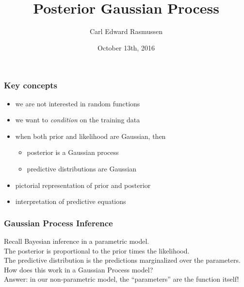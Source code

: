 

\title{Posterior Gaussian Process}
\author{Carl Edward Rasmussen}
\date{October 13th, 2016}



\begin{frame}
\titlepage
\end{frame}

\begin{frame}
\frametitle{Key concepts}
\begin{itemize}
\item we are not interested in random functions
\item we want to \emph{condition} on the training data
\item when both prior and likelihood are Gaussian, then
\begin{itemize}
\item posterior is a Gaussian process
\item predictive distributions are Gaussian
\end{itemize}
\item pictorial representation of prior and posterior
\item interpretation of predictive equations
\end{itemize}
\end{frame}

\begin{frame}
\frametitle{Gaussian Process Inference}

Recall Bayesian inference in a parametric model.\\[1ex]

The posterior is proportional to the prior times the likelihood.\\[1ex]

The predictive distribution is the predictions marginalized over the
parameters.\\[1ex]

How does this work in a Gaussian Process model?\\[1ex]

Answer: in our non-parametric model, the ``parameters'' are the function itself!
\end{frame}


